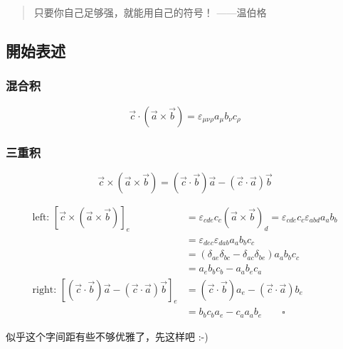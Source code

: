 \documentclass{article}
\begin{document}
\begin{quote}
    只要你自己足够强，就能用自己的符号！ ——温伯格
\end{quote}

\subsection{開始表述}

\subsubsection{混合积}

$$\vec{c}\cdot(\vec{a}\times\vec{b})=\varepsilon_{\mu\nu\rho}a_{\mu}b_{\nu}c_{\rho}$$

\subsubsection{三重积}

$$\vec{c}\times(\vec{a}\times\vec{b})=(\vec{c}\cdot\vec{b})\vec{a}-(\vec{c}\cdot\vec{a})\vec{b}$$

$$\begin{aligned}
        \text{left: }[\vec{c}\times(\vec{a}\times\vec{b})]_e                        & =\varepsilon_{cde}c_{c}(\vec{a}\times\vec{b})_{d}=\varepsilon_{cde}c_{c}\varepsilon_{abd}a_{a}b_{b} \\
                                                                                    & =\varepsilon_{dec}\varepsilon_{dab}a_{a}b_{b}c_{c}                                                  \\
                                                                                    & =(\delta_{ae}\delta_{bc}-\delta_{ac}\delta_{be})a_{a}b_{b}c_{c}                                     \\
                                                                                    & =a_{e}b_{b}c_{b}-a_{a}b_{e}c_{a}                                                                    \\
        \text{right: }[(\vec{c}\cdot\vec{b})\vec{a}-(\vec{c}\cdot\vec{a})\vec{b}]_e & =(\vec{c}\cdot\vec{b})a_{e}-(\vec{c}\cdot\vec{a})b_{e}                                              \\
                                                                                    & =b_{b}c_{b}a_{e}-c_{a}a_ab_e\qquad\square
    \end{aligned}$$

似乎这个字间距有些不够优雅了，先这样吧 :-)
\end{document}
